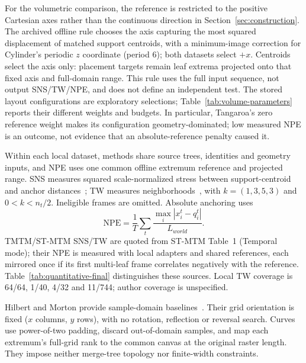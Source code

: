 \documentclass[review]{vgtc}
\begin{document}
For the volumetric comparison, the reference is restricted to the positive Cartesian axes rather than the continuous direction in Section~\ref{sec:construction}. The archived offline rule chooses the axis capturing the most squared displacement of matched support centroids, with a minimum-image correction for Cylinder's periodic $z$ coordinate (period 6); both datasets select $+x$. Centroids select the axis only: placement targets remain leaf extrema projected onto that fixed axis and full-domain range. This rule uses the full input sequence, not output SNS/TW/NPE, and does not define an independent test. The stored layout configurations are exploratory selections; Table~\ref{tab:volume-parameters} reports their different weights and budgets. In particular, Tangaroa's zero reference weight makes its configuration geometry-dominated; low measured NPE is an outcome, not evidence that an absolute-reference penalty caused it.

Within each local dataset, methods share source trees, identities and geometry inputs, and NPE uses one common offline extremum reference and projected range. SNS measures squared scale-normalized stress between support-centroid and anchor distances~\cite{Smelser:2025:Scale,STMTM:2026}; TW measures neighborhoods~\cite{Venna:2001:NP}, with $k=(1,3,5,3)$ and $0<k<n_t/2$. Ineligible frames are omitted. Absolute anchoring uses
\begin{equation}\label{eq:experimental-npe}
\mathrm{NPE}=\frac{1}{T}\sum_t\frac{\max_i|x_i^t-q_i^t|}{L_{world}}.
\end{equation}
TMTM/ST-MTM SNS/TW are quoted from ST-MTM Table~1 (Temporal mode); their NPE is measured with local adapters and shared references, each mirrored once if its first multi-leaf frame correlates negatively with the reference. Table~\ref{tab:quantitative-final} distinguishes these sources. Local TW coverage is 64/64, 1/40, 4/32 and 11/744; author coverage is unspecified.

Hilbert and Morton provide sample-domain baselines~\cite{Franke:2021:1DP}. Their grid orientation is fixed ($x$ columns, $y$ rows), with no rotation, reflection or reversal search. Curves use power-of-two padding, discard out-of-domain samples, and map each extremum's full-grid rank to the common canvas at the original raster length. They impose neither merge-tree topology nor finite-width constraints.
\end{document}
